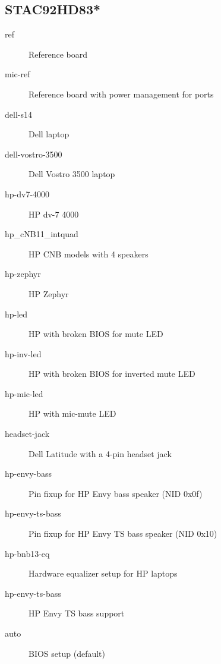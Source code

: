 \documentclass[a4paper,8pt,english]{sphinxmanual}
\begin{document}
\subsection{STAC92HD83*}
\label{sound/hd-audio/models:stac92hd83}\begin{description}
\item[{ref}] \leavevmode
Reference board

\item[{mic-ref}] \leavevmode
Reference board with power management for ports

\item[{dell-s14}] \leavevmode
Dell laptop

\item[{dell-vostro-3500}] \leavevmode
Dell Vostro 3500 laptop

\item[{hp-dv7-4000}] \leavevmode
HP dv-7 4000

\item[{hp\_cNB11\_intquad}] \leavevmode
HP CNB models with 4 speakers

\item[{hp-zephyr}] \leavevmode
HP Zephyr

\item[{hp-led}] \leavevmode
HP with broken BIOS for mute LED

\item[{hp-inv-led}] \leavevmode
HP with broken BIOS for inverted mute LED

\item[{hp-mic-led}] \leavevmode
HP with mic-mute LED

\item[{headset-jack}] \leavevmode
Dell Latitude with a 4-pin headset jack

\item[{hp-envy-bass}] \leavevmode
Pin fixup for HP Envy bass speaker (NID 0x0f)

\item[{hp-envy-ts-bass}] \leavevmode
Pin fixup for HP Envy TS bass speaker (NID 0x10)

\item[{hp-bnb13-eq}] \leavevmode
Hardware equalizer setup for HP laptops

\item[{hp-envy-ts-bass}] \leavevmode
HP Envy TS bass support

\item[{auto}] \leavevmode
BIOS setup (default)

\end{description}
\end{document}
